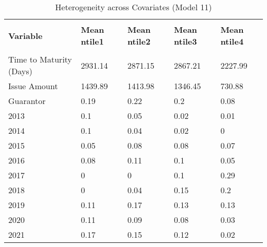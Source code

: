 \begin{table}[H]
\caption{Heterogeneity across Covariates (Model 11)}
\label{Het}
\footnotesize
\begin{tabular}{lllll}
\\[-1.8ex]\hline 
\hline \\[-1.8ex] 
{\color[HTML]{333333} \textbf{Variable}} & {\color[HTML]{333333} \textbf{Mean ntile1}} & {\color[HTML]{333333} \textbf{Mean ntile2}} & {\color[HTML]{333333} \textbf{Mean ntile3}} & {\color[HTML]{333333} \textbf{Mean ntile4}} \\
\hline \\[-1.8ex] 
Time to   Maturity (Days) & \cellcolor[HTML]{63BE7B}2931.14 & \cellcolor[HTML]{71C487}2871.15 & \cellcolor[HTML]{71C488}2867.21 & \cellcolor[HTML]{FCFCFF}2227.99 \\
Issue Amount & \cellcolor[HTML]{63BE7B}1439.89 & \cellcolor[HTML]{69C180}1413.98 & \cellcolor[HTML]{78C78D}1346.45 & \cellcolor[HTML]{FCFCFF}730.88 \\
Guarantor & \cellcolor[HTML]{DBEFE2}0.19 & \cellcolor[HTML]{D5EDDE}0.22 & \cellcolor[HTML]{D9EEE1}0.2 & \cellcolor[HTML]{EEF7F3}0.08 \\
2013 & \cellcolor[HTML]{EBF5F0}0.1 & \cellcolor[HTML]{F4F9F8}0.05 & \cellcolor[HTML]{F9FBFC}0.02 & \cellcolor[HTML]{FBFCFE}0.01 \\
2014 & \cellcolor[HTML]{EBF5F0}0.1 & \cellcolor[HTML]{F5FAF9}0.04 & \cellcolor[HTML]{F9FBFC}0.02 & \cellcolor[HTML]{FCFCFF}0 \\
2015 & \cellcolor[HTML]{F4F9F8}0.05 & \cellcolor[HTML]{EEF7F3}0.08 & \cellcolor[HTML]{EEF7F3}0.08 & \cellcolor[HTML]{F0F7F5}0.07 \\
2016 & \cellcolor[HTML]{EEF7F3}0.08 & \cellcolor[HTML]{E9F5EF}0.11 & \cellcolor[HTML]{EBF5F0}0.1 & \cellcolor[HTML]{F4F9F8}0.05 \\
2017 & \cellcolor[HTML]{FCFCFF}0 & \cellcolor[HTML]{FCFCFF}0 & \cellcolor[HTML]{EBF5F0}0.1 & \cellcolor[HTML]{C9E8D3}0.29 \\
2018 & \cellcolor[HTML]{FCFCFF}0 & \cellcolor[HTML]{F5FAF9}0.04 & \cellcolor[HTML]{E2F2E8}0.15 & \cellcolor[HTML]{D9EEE1}0.2 \\
2019 & \cellcolor[HTML]{E9F5EF}0.11 & \cellcolor[HTML]{DEF0E5}0.17 & \cellcolor[HTML]{E5F3EC}0.13 & \cellcolor[HTML]{E5F3EC}0.13 \\
2020 & \cellcolor[HTML]{E9F5EF}0.11 & \cellcolor[HTML]{ECF6F2}0.09 & \cellcolor[HTML]{EEF7F3}0.08 & \cellcolor[HTML]{F7FAFB}0.03 \\
2021 & \cellcolor[HTML]{DEF0E5}0.17 & \cellcolor[HTML]{E2F2E8}0.15 & \cellcolor[HTML]{E7F4ED}0.12 & \cellcolor[HTML]{F9FBFC}0.02 \\

\end{tabular}
\end{table}
